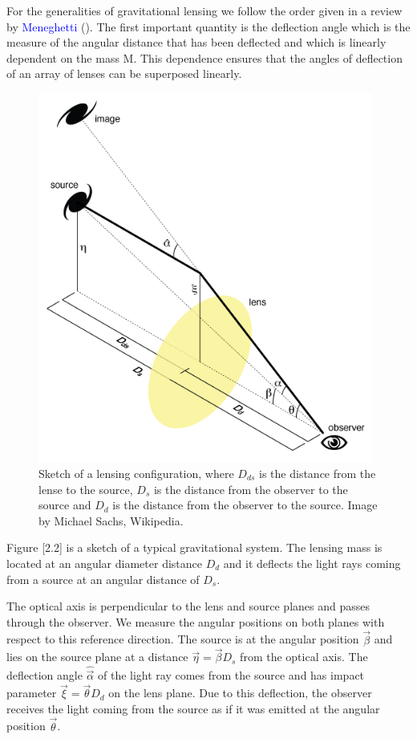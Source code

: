 For the generalities of gravitational lensing we follow the order given in a review by \textcolor{blue}{Meneghetti} (\citeyear{Reference26}). The first important quantity is the deflection angle which is the measure of the angular distance that has been deflected and which is linearly dependent on the mass $\text{M}$. This dependence ensures that the angles of deflection of an array of lenses can be superposed linearly.

\begin{figure}[H]
\centering
\includegraphics[width=11cm]{images/lensing.png}
\caption[Angles in gravitational lensing]{Sketch of a lensing configuration, where $D_{ds}$ is the distance from the lense to the source, $D_s$ is the distance from the observer to the source and $D_d$ is the distance from the observer to the source. Image by Michael Sachs, Wikipedia.}
\end{figure}

Figure [2.2] is a sketch of a typical gravitational system. The lensing mass is located at an angular diameter distance $D_d$ and it deflects the light rays coming from a source at an angular distance of $D_s$.

The optical axis is perpendicular to the lens and source planes and passes through the observer. We measure the angular positions on both planes with respect to this reference direction. The source is at the angular position $\vec{\beta}$ and lies on the source plane at a distance $\vec{\eta}=\vec{\beta}D_s$ from the optical axis. The deflection angle $\hat{\vec{\alpha}}$ of the light ray comes from the source and has impact parameter $\vec{\xi}=\vec{\theta}D_d$ on the lens plane. Due to this deflection, the observer receives the light coming from the source as if it was emitted at the angular position $\vec{\theta}$.

